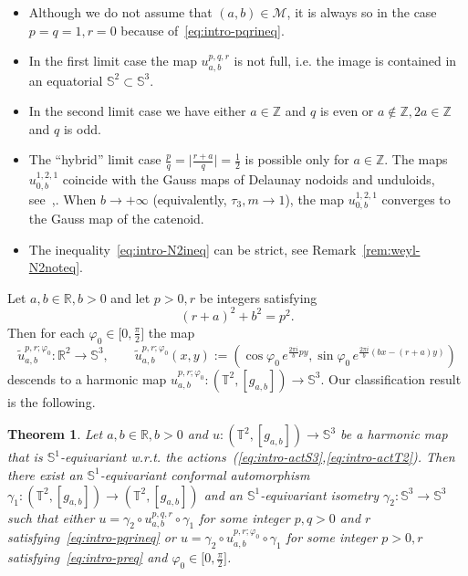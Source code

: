 \documentclass{amsart}
\let\phi\varphi
\theoremstyle{plain}
\newtheorem{theorem}{Theorem}
\theoremstyle{definition}
\theoremstyle{remark}
\begin{document}
\begin{itemize}
\item
Although we do not assume that \((a,b)\in\mathcal M\), it is always so in the
case \(p=q=1,r=0\) because of~\eqref{eq:intro-pqrineq}.

\item
In the first limit case the map \(u_{a,b}^{p,q,r}\) is not full, i.e. the image
is contained in an equatorial \(\mathbb S^2\subset\mathbb S^3\).

\item
In the second limit case we have either \(a\in\mathbb Z\) and \(q\) is even or
\(a\notin\mathbb Z,2a\in\mathbb Z\) and \(q\) is odd.

\item
The ``hybrid'' limit case \(\frac{p}q=\bigl|\frac{r+a}q\bigr|=\frac{1}2\) is
possible only for \(a\in\mathbb Z\). The maps \(u_{0,b}^{1,2,1}\) coincide with
the Gauss maps of Delaunay nodoids and unduloids,
see~\cite[sec.~4]{Eel1987},\cite[Theorem~4.3.2]{Smith1972}. When \(b\to+\infty\)
(equivalently, \(\tau_3,m\to 1\)), the map \(u_{0,b}^{1,2,1}\) converges to the
Gauss map of the catenoid.

\item
The inequality~\eqref{eq:intro-N2ineq} can be strict, see
Remark~\ref{rem:weyl-N2noteq}.
\end{itemize}

Let \(a,b\in\mathbb R,b>0\) and let \(p>0,r\) be integers satisfying
\begin{equation}\label{eq:intro-preq}
(r+a)^2+b^2=p^2.
\end{equation}
Then for each \(\phi_0\in\bigl[0,\frac{\pi}2\bigr]\) the map
\[
\tilde u_{a,b}^{p,r;\phi_0}\colon\mathbb R^2\to\mathbb S^3,\qquad
\tilde u_{a,b}^{p,r;\phi_0}(x,y):=
(\cos\phi_0\,e^{\frac{2\pi i}b py},\sin\phi_0\,e^{\frac{2\pi i}b (bx-(r+a)y)})
\]
descends to a harmonic map \(u_{a,b}^{p,r;\phi_0}\colon (\mathbb
T^2,[g_{a,b}])\to\mathbb S^3\). Our classification result is the following.

\begin{theorem}\label{th:intro-harm}
Let \(a,b\in\mathbb R,b>0\) and \(u\colon (\mathbb T^2,[g_{a,b}])\to\mathbb
S^3\) be a harmonic map that is \(\mathbb S^1\)-equivariant w.r.t. the
actions~(\ref{eq:intro-actS3},\ref{eq:intro-actT2}). Then there exist an
\(\mathbb S^1\)-equivariant conformal automorphism \(\gamma_1\colon (\mathbb
T^2,[g_{a,b}])\to (\mathbb T^2,[g_{a,b}])\) and an \(\mathbb S^1\)-equivariant
isometry \(\gamma_2\colon\mathbb S^3\to\mathbb S^3\) such that either
\(u=\gamma_2\circ u_{a,b}^{p,q,r}\circ\gamma_1\) for some integer \(p,q>0\) and
\(r\) satisfying~\eqref{eq:intro-pqrineq} or \(u=\gamma_2\circ
u_{a,b}^{p,r;\phi_0}\circ\gamma_1\) for some integer \(p>0,r\)
satisfying~\eqref{eq:intro-preq} and \(\phi_0\in\bigl[0,\frac{\pi}2\bigr]\).
\end{theorem}
\end{document}
